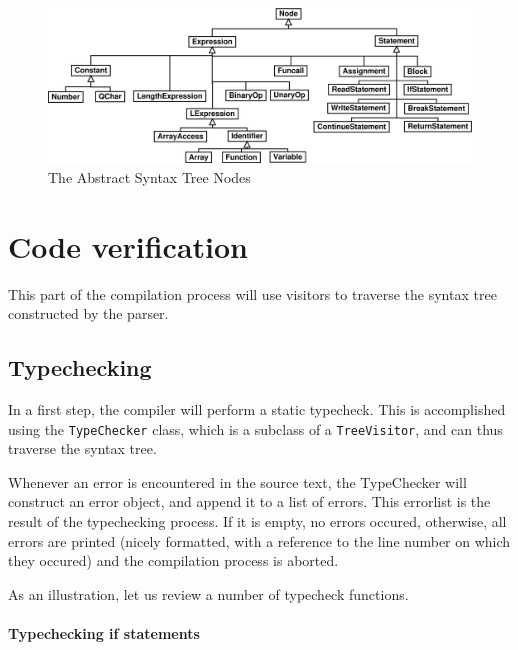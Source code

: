 \documentclass[a4paper]{article}
\begin{document}
\begin{center}
\begin{figure}[htb]
\includegraphics[width=1\textwidth]{syntaxtree_uml}
\caption{\label{syntaxtreediagram} The Abstract Syntax Tree Nodes}
\end{figure}
\end{center}

\section{Code verification}

This part of the compilation process will use visitors to traverse the syntax
tree constructed by the parser.

\subsection{Typechecking}

In a first step, the compiler will perform a static typecheck. This is
accomplished using the \texttt{TypeChecker} class, which is a subclass of a
\texttt{TreeVisitor}, and can thus traverse the syntax tree.

Whenever an error is encountered in the source text, the TypeChecker will
construct an error object, and append it to a list of errors. This errorlist
is the result of the typechecking process. If it is empty, no errors occured,
otherwise, all errors are printed (nicely formatted, with a reference to the
line number on which they occured) and the compilation process is aborted.

As an illustration, let us review a number of typecheck functions.

\paragraph{Typechecking if statements\\}
\end{document}
